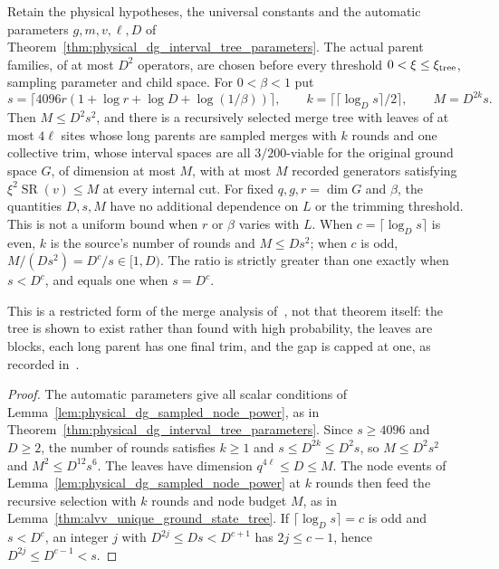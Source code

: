 \begin{lemma}
    \label{thm:physical_dg_constant_node_tree}
    \leanok
    Retain the physical hypotheses, the universal constants and the automatic
    parameters $g,m,v,\ell,D$ of
    Theorem~\ref{thm:physical_dg_interval_tree_parameters}. The actual parent
    families, of at most $D^2$ operators, are chosen before every threshold
    $0<\xi\le\xi_{\rm tree}$, sampling parameter and child space. For
    $0<\beta<1$ put
    \[
        s=\lceil4096r(1+\log r+\log D+\log(1/\beta))\rceil,\qquad
        k=\lceil\lceil\log_Ds\rceil/2\rceil,\qquad
        M=D^{2k}s.
    \]
    Then $M\le D^2s^2$, and there is a recursively selected merge tree with
    leaves of at most $4\ell$ sites whose long parents are sampled merges with
    $k$ rounds and one collective trim, whose interval spaces are all
    $3/200$-viable for the original ground space $G$, of dimension at most
    $M$, with at most $M$ recorded generators satisfying
    $\xi^2\operatorname{SR}(v)\le M$ at every internal cut. For fixed
    $q,g,r=\dim G$ and $\beta$, the quantities $D,s,M$ have no additional
    dependence on $L$ or the trimming threshold. This is not a uniform
    bound when $r$ or $\beta$ varies with $L$.
    When $c=\lceil\log_Ds\rceil$ is even, $k$ is the source's number of
    rounds and $M\le Ds^2$; when $c$ is odd,
    $M/(Ds^2)=D^c/s\in[1,D)$. The ratio is strictly greater than one
    exactly when $s<D^c$, and equals one when $s=D^c$.

    This is a restricted form of the merge analysis
    of~\cite[Theorem~\texttt{t:alg1}, lines 1777--1818]{Arad2016RigorousRG},
    not that theorem itself: the tree is shown to exist rather than found with
    high probability, the leaves are blocks, each long parent has one final
    trim, and the gap is capped at one, as recorded
    in~\cite{gap:alvv16_approximation_parameters}.
\end{lemma}
\begin{proof}\leanok
    The automatic parameters give all scalar conditions of
    Lemma~\ref{lem:physical_dg_sampled_node_power}, as in
    Theorem~\ref{thm:physical_dg_interval_tree_parameters}. Since
    $s\ge4096$ and $D\ge2$, the number of rounds satisfies $k\ge1$ and
    $s\le D^{2k}\le D^2s$, so $M\le D^2s^2$ and $M^2\le D^{12}s^6$. The leaves
    have dimension $q^{4\ell}\le D\le M$. The node events of
    Lemma~\ref{lem:physical_dg_sampled_node_power} at $k$ rounds then feed the
    recursive selection with $k$ rounds and node budget $M$, as in
    Lemma~\ref{thm:alvv_unique_ground_state_tree}. If
    $\lceil\log_Ds\rceil=c$ is odd and $s<D^c$, an integer $j$ with
    $D^{2j}\le Ds<D^{c+1}$ has $2j\le c-1$, hence $D^{2j}\le D^{c-1}<s$.
\end{proof}

